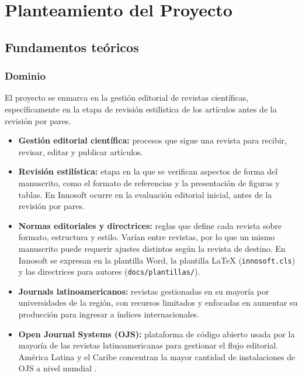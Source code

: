 
\chapter{Planteamiento del Proyecto}\label{cap:planteamiento}

\section{Fundamentos teóricos}

\subsection{Dominio}

El proyecto se enmarca en la gestión editorial de revistas científicas, específicamente en la etapa de revisión estilística de los artículos antes de la revisión por pares.

\begin{itemize}
  \item \textbf{Gestión editorial científica:} procesos que sigue una revista para recibir, revisar, editar y publicar artículos.
  \item \textbf{Revisión estilística:} etapa en la que se verifican aspectos de forma del manuscrito, como el formato de referencias y la presentación de figuras y tablas. En Innosoft ocurre en la evaluación editorial inicial, antes de la revisión por pares.
  \item \textbf{Normas editoriales y directrices:} reglas que define cada revista sobre formato, estructura y estilo. Varían entre revistas, por lo que un mismo manuscrito puede requerir ajustes distintos según la revista de destino. En Innosoft se expresan en la plantilla Word, la plantilla LaTeX (\texttt{innosoft.\allowbreak{}cls}) y las directrices para autores (\texttt{docs/\allowbreak{}plantillas/\allowbreak{}}).
  \item \textbf{Journals latinoamericanos:} revistas gestionadas en su mayoría por universidades de la región, con recursos limitados y enfocadas en aumentar su producción para ingresar a índices internacionales.
  \item \textbf{Open Journal Systems (OJS):} plataforma de código abierto usada por la mayoría de las revistas latinoamericanas para gestionar el flujo editorial. América Latina y el Caribe concentran la mayor cantidad de instalaciones de OJS a nivel mundial \cite{ref2}.
\end{itemize}

